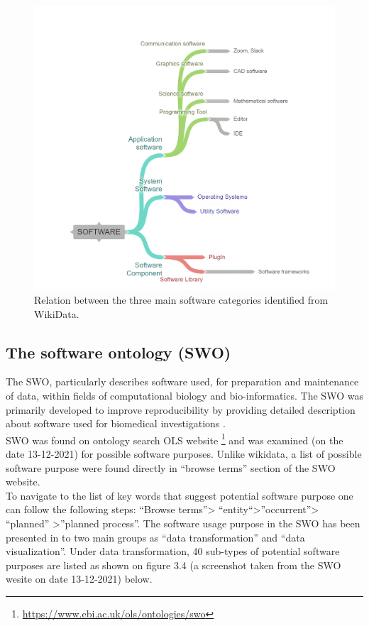 \begin{figure}[htbp]
	\centering
	\includegraphics[width=.70\textwidth]{4.graphics/figures/ch_3/chart_hd}
	\caption{Relation between the three main software categories identified from WikiData.}
	\label{fig:chapter03:setup}
\end{figure}


\subsection{The software ontology (SWO)}
\label{subsec:purpose:ontologies:SWO}

The \ac{SWO}, particularly describes software used, for preparation and maintenance of data, within fields of computational biology and bio-informatics.  The \ac{SWO} was primarily developed to improve reproducibility by providing detailed description about software used for biomedical investigations \citep{malone2014software}. \\

\ac{SWO} was found on ontology search \ac{OLS} website \footnote{\url{https://www.ebi.ac.uk/ols/ontologies/swo}} and was examined (on the date 13-12-2021) for possible software purposes. Unlike wikidata, a list of possible software purpose were found directly in “browse terms” section of the SWO website.  \\

To navigate to the list of key words that suggest potential software purpose one can follow the following steps: “Browse terms”> “entity“>”occurrent”> “planned” >”planned process”.  The software usage purpose in the SWO has been presented in to two main groups as “data transformation” and “data visualization”.  Under data transformation, 40 sub-types of potential software purposes are listed as shown on figure 3.4 (a screenshot taken from the SWO wesite on date 13-12-2021) below. \\


